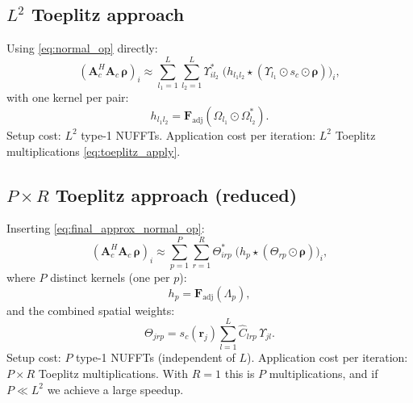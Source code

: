 \documentclass{article}
\begin{document}
\subsection*{$L^2$ Toeplitz approach}

Using \eqref{eq:normal_op} directly:
\begin{equation}
    (\mathbf{A}_c^H\mathbf{A}_c\,\boldsymbol{\rho})_i
        \approx \sum_{l_1=1}^L \sum_{l_2=1}^L
            \Upsilon_{il_2}^*\;
            \bigl(h_{l_1 l_2} \star (\Upsilon_{l_1} \odot s_c \odot \boldsymbol{\rho})\bigr)_i,
    \label{eq:normal_op_Lsq}
\end{equation}
with one kernel per pair:
\begin{equation}
    h_{l_1 l_2} = \mathbf{F}_{\mathrm{adj}}(\Omega_{l_1} \odot \Omega_{l_2}^*).
\end{equation}
Setup cost: $L^2$ type-1 NUFFTs.
Application cost per iteration: $L^2$ Toeplitz multiplications \eqref{eq:toeplitz_apply}.

\subsection*{$P \times R$ Toeplitz approach (reduced)}

Inserting \eqref{eq:final_approx_normal_op}:
\begin{equation}
    (\mathbf{A}_c^H\mathbf{A}_c\,\boldsymbol{\rho})_i
        \approx \sum_{p=1}^P \sum_{r=1}^R
            \Theta_{irp}^*\;
            \bigl(h_p \star (\Theta_{rp} \odot \boldsymbol{\rho})\bigr)_i,
    \label{eq:normal_op_PR}
\end{equation}
where $P$ distinct kernels (one per $p$):
\begin{equation}
    h_p = \mathbf{F}_{\mathrm{adj}}(\Lambda_p),
\end{equation}
and the combined spatial weights:
\begin{equation}
    \Theta_{jrp} = s_c(\mathbf{r}_j)\sum_{l=1}^L \hat{C}_{lrp}\,\Upsilon_{jl}.
\end{equation}
Setup cost: $P$ type-1 NUFFTs (independent of $L$).
Application cost per iteration: $P \times R$ Toeplitz multiplications.
With $R=1$ this is $P$ multiplications, and if $P \ll L^2$ we achieve a large speedup.
\end{document}
